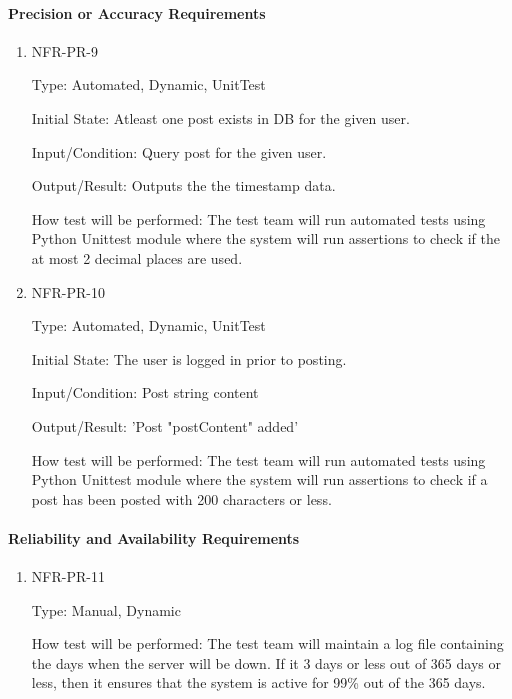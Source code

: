 \documentclass[12pt, titlepage]{article}
\begin{document}
\paragraph{Precision or Accuracy Requirements}
\begin{enumerate}
    \item{NFR-PR-9\\}
    
    Type: Automated, Dynamic, UnitTest
    
    Initial State: Atleast one post exists in DB for the given user.
    					
    Input/Condition: Query post for the given user.
    					
    Output/Result: Outputs the the timestamp data.
    					
    How test will be performed: The test team will run automated tests using Python Unittest module where the system will run assertions to check if the at most 2 decimal places are used.
    
\item{NFR-PR-10\\}
    
    Type: Automated, Dynamic, UnitTest
    
    Initial State: The user is logged in prior to posting.
    					
    Input/Condition: Post string content
    					
    Output/Result: 'Post "{postContent}" added'
    					
    How test will be performed: The test team will run automated tests using Python Unittest module where the system will run assertions to check if a post has been posted with 200 characters or less.

\end{enumerate}

\paragraph{Reliability and Availability Requirements}
\begin{enumerate}
    \item{NFR-PR-11\\}
    
    Type: Manual, Dynamic
    
    How test will be performed: The test team will maintain a log file containing the days when the server will be down. If it 3 days or less out of 365 days or less, then it ensures that the system is active for 99\% out of the 365 days.
 \end{enumerate}   
 
\end{document}
